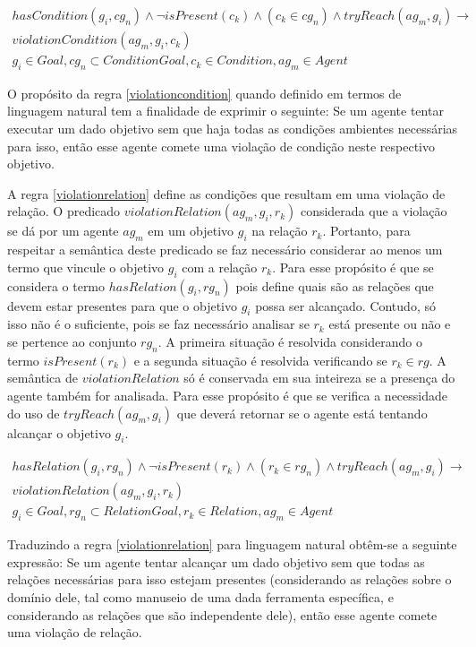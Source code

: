 \begin{eqnarray}\label{violationcondition}\nonumber
	hasCondition(g_i,cg_n) \wedge \neg isPresent(c_k) \wedge (c_k \in cg_n) \wedge tryReach(ag_m,g_i) \to \nonumber \\  
	violationCondition(ag_m,g_i,c_k) \nonumber \\  
    g_i \in Goal, cg_n \subset ConditionGoal, c_k \in Condition, ag_m \in Agent
\end{eqnarray}

O propósito da regra \ref{violationcondition} quando definido em termos de linguagem natural tem a finalidade de exprimir o seguinte: Se um agente tentar executar um dado objetivo sem que haja todas as condições ambientes necessárias para isso, então esse agente comete uma violação de condição neste respectivo objetivo. 

A regra \ref{violationrelation} define as condições que resultam em uma violação de relação. O predicado $violationRelation(ag_m,g_i,r_k)$ considerada que a violação se dá por um agente $ag_m$ em um objetivo $g_i$ na relação $r_k$. Portanto, para respeitar a semântica deste predicado se faz necessário considerar ao menos um termo que vincule o objetivo $g_i$ com a relação $r_k$. Para esse propósito é que se considera o termo $hasRelation(g_i,rg_n)$ pois define quais são as relações que devem estar presentes para que o objetivo $g_i$ possa ser alcançado. Contudo, só isso não é o suficiente, pois se faz necessário analisar se $r_k$ está presente ou não e se pertence ao conjunto $rg_n$. A primeira situação é resolvida considerando o termo $isPresent(r_k)$ e a segunda situação é resolvida verificando se $r_k \in rg$. A semântica de $violationRelation$ só é conservada em sua inteireza se a presença do agente também for analisada. Para esse propósito é que se verifica a necessidade do uso de $tryReach(ag_m,g_i)$ que deverá retornar se o agente está tentando alcançar o objetivo $g_i$.   

\begin{eqnarray}\label{violationrelation}\nonumber
	hasRelation(g_i,rg_n)\wedge \neg isPresent(r_k) \wedge (r_k \in rg_n) \wedge tryReach(ag_m,g_i) \to \nonumber \\
	violationRelation(ag_m,g_i,r_k) \nonumber \\  
    g_i \in Goal, rg_n \subset RelationGoal, r_k \in Relation, ag_m \in Agent
\end{eqnarray}

Traduzindo a regra \ref{violationrelation} para linguagem natural obtêm-se a seguinte expressão: Se um agente tentar alcançar um dado objetivo sem que todas as relações necessárias para isso estejam presentes (considerando as relações sobre o domínio dele, tal como manuseio de uma dada ferramenta específica, e considerando as relações que são independente dele), então esse agente comete uma violação de relação. 

